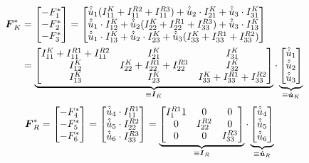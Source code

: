 \begin{equation}
\begin{split}
\boldsymbol{F}^*_K &= \begin{bmatrix}-F^*_1 \\ -F^*_2 \\ -F^*_3\end{bmatrix} = 
\begin{bmatrix}
\hat{\dot{u}}_1(I^K_{11}+I^{R2}_{11}+I^{R3}_{11}) + \hat{\dot{u}}_2\cdot I^{K}_{21} + \hat{\dot{u}}_3\cdot I^{K}_{31}
\\
\hat{\dot{u}}_1\cdot I^{K}_{12} + \hat{\dot{u}}_2(I^{K}_{22}+I^{R1}_{22}+I^{R3}_{33}) + \hat{\dot{u}}_3\cdot I^{K}_{13} 
\\
\hat{\dot{u}}_1\cdot I^{K}_{13} + \hat{\dot{u}}_2\cdot I^{K}_{23} + \hat{\dot{u}}_3(I^{K}_{33}+I^{R1}_{33}+I^{R2}_{33})
\end{bmatrix} \\
&= 
\underbrace{
\begin{bmatrix}
I^K_{11}+I^{R1}_{11}+I^{R2}_{11} & I^K_{21} & I^K_{31} \\
I^K_{12} & I^K_{22}+I^{R1}_{22}+I^{R3}_{22} & I^K_{32} \\
I^K_{13} & I^K_{23} & I^K_{33}+I^{R1}_{33}+I^{R2}_{33}
\end{bmatrix}}_{\equiv \boldsymbol{I}_K} \cdot \underbrace{\begin{bmatrix}
\hat{\dot{u}}_1 \\ \hat{\dot{u}}_2 \\ \hat{\dot{u}}_3
\end{bmatrix}}_{\equiv \boldsymbol{\dot{u}}_K}
\end{split}
\end{equation} 
\begin{equation}
\begin{split}
\boldsymbol{F}^*_R &= \begin{bmatrix}-F^*_4 \\ -F^*_5 \\ -F^*_6 \end{bmatrix} = 
\begin{bmatrix}
\hat{\dot{u}}_4 \cdot I^{R1}_{11} \\ \hat{\dot{u}}_5\cdot I^{R2}_{22} \\ \hat{\dot{u}}_6\cdot I^{R3}_{33}
\end{bmatrix} = \underbrace{\begin{bmatrix}
I^{R1}_11 & 0 & 0 \\ 0 & I^{R2}_{22} & 0 \\ 0 & 0 & I^{R3}_{33}
\end{bmatrix}}_{\equiv \boldsymbol{I}_R} \cdot \underbrace{\begin{bmatrix}
\hat{\dot{u}}_4 \\ \hat{\dot{u}}_5 \\ \hat{\dot{u}}_6
\end{bmatrix}}_{\equiv \boldsymbol{\dot{u}}_R}
\end{split}
\end{equation}
